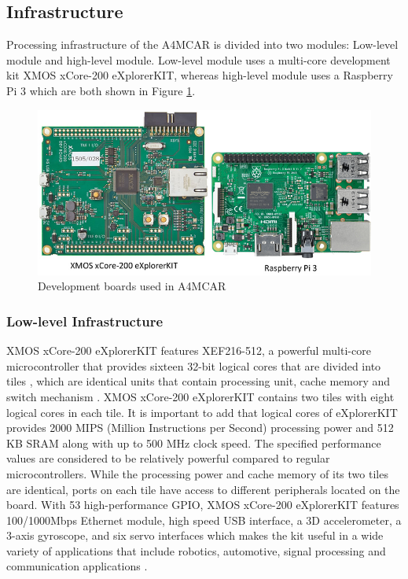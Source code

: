 \subsection{Infrastructure}  %
Processing infrastructure of the A4MCAR is divided into two modules: Low-level module and high-level module. Low-level module uses a multi-core development kit XMOS xCore-200 eXplorerKIT, whereas high-level module uses a Raspberry Pi 3 which are both shown in Figure \ref{fig:boards}.
\begin{figure}[!ht]
	\centering
	\captionsetup{justification=centering}
	\includegraphics[scale=0.6]{content/images/boards.jpg}
	\caption{Development boards used in A4MCAR}
	\label{fig:boards}
\end{figure}

\subsubsection{Low-level Infrastructure} \label{lowlevelmoduleinfra}
XMOS xCore-200 eXplorerKIT features XEF216-512, a powerful multi-core microcontroller that provides sixteen 32-bit logical cores that are divided into tiles \cite{xmoskitweb}, which are identical units that contain processing unit, cache memory and switch mechanism \cite{tileref}. XMOS xCore-200 eXplorerKIT contains two tiles with eight logical cores in each tile. It is important to add that logical cores of eXplorerKIT provides 2000 MIPS (Million Instructions per Second) processing power and 512 KB SRAM along with up to 500 MHz clock speed. The specified performance values are considered to be relatively powerful compared to regular microcontrollers. While the processing power and cache memory of its two tiles are identical, ports on each tile have access to different peripherals located on the board. With 53 high-performance GPIO, XMOS xCore-200 eXplorerKIT features 100/1000Mbps Ethernet module, high speed USB interface, a 3D accelerometer, a 3-axis gyroscope, and six servo interfaces which makes the kit useful in a wide variety of applications that include robotics, automotive, signal processing and communication applications \cite{xmoskitweb}.

